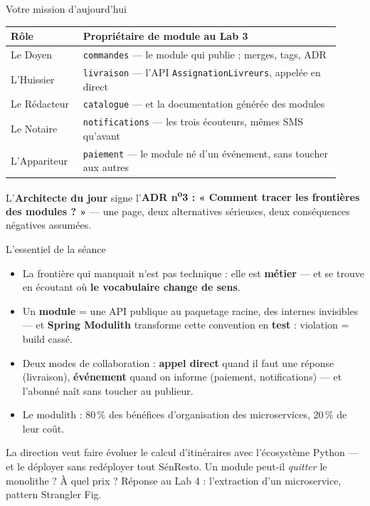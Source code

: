 \documentclass[aspectratio=169,11pt]{beamer}
\begin{document}
\begin{frame}{Votre mission d'aujourd'hui}
{\scriptsize\begin{tabular}{p{0.20\linewidth}p{0.72\linewidth}}
\toprule
\textbf{Rôle} & \textbf{Propriétaire de module au Lab 3}\\
\midrule
Le Doyen & \texttt{commandes} — le module qui publie ; merges, tags, ADR\\
L'Huissier & \texttt{livraison} — l'API \texttt{AssignationLivreurs}, appelée en direct\\
Le Rédacteur & \texttt{catalogue} — et la documentation générée des modules\\
Le Notaire & \texttt{notifications} — les trois écouteurs, mêmes SMS qu'avant\\
L'Appariteur & \texttt{paiement} — le module né d'un événement, sans toucher aux autres\\
\bottomrule
\end{tabular}}
\vskip4pt
\begin{ucadrec}
{\small L'\textbf{Architecte du jour} signe l'\textbf{ADR n\textsuperscript{o}3 : « Comment tracer les frontières des modules ? »} — une page, deux alternatives sérieuses, deux conséquences négatives assumées.}
\end{ucadrec}
\end{frame}

\begin{frame}{L'essentiel de la séance}
\begin{ucadret}[À retenir]
{\footnotesize
\begin{itemize}
  \item La frontière qui manquait n'est pas technique : elle est \textbf{métier} — et se trouve en écoutant où \textbf{le vocabulaire change de sens}.
  \item Un \textbf{module} = une API publique au paquetage racine, des internes invisibles — et \textbf{Spring Modulith} transforme cette convention en \textbf{test} : violation = build cassé.
  \item Deux modes de collaboration : \textbf{appel direct} quand il faut une réponse (livraison), \textbf{événement} quand on informe (paiement, notifications) — et l'abonné naît sans toucher au publieur.
  \item Le modulith : 80\,\% des bénéfices d'organisation des microservices, 20\,\% de leur coût.
\end{itemize}}
\end{ucadret}
\begin{ucadfront}
{\footnotesize La direction veut faire évoluer le calcul d'itinéraires avec l'écosystème Python — et le déployer sans redéployer tout SénResto. Un module peut-il \emph{quitter} le monolithe ? À quel prix ? Réponse au Lab 4 : l'extraction d'un microservice, pattern Strangler Fig.}
\end{ucadfront}
\end{frame}
\end{document}
